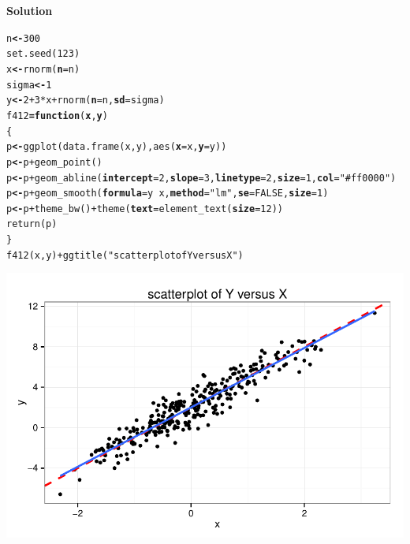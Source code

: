 \documentclass[12pt,oneside,a4paper]{article}\usepackage[]{graphicx}\usepackage[]{xcolor}
\makeatletter
\newcommand{\hlnum}[1]{\textcolor[rgb]{0,0,0}{#1}}%
\newcommand{\hlstr}[1]{\textcolor[rgb]{0,0,1}{#1}}%
\newcommand{\hlopt}[1]{\textcolor[rgb]{0,0,0}{#1}}%
\newcommand{\hlstd}[1]{\textcolor[rgb]{0,0,0}{#1}}%
\newcommand{\hlkwa}[1]{\textcolor[rgb]{0.498,0,0.333}{\textbf{#1}}}%
\newcommand{\hlkwb}[1]{\textcolor[rgb]{0.498,0,0.333}{\textbf{#1}}}%
\newcommand{\hlkwc}[1]{\textcolor[rgb]{0.498,0,0.333}{\textbf{#1}}}%
\newcommand{\hlkwd}[1]{\textcolor[rgb]{0,0,0}{#1}}%
\newenvironment{kframe}{%
 \def\at@end@of@kframe{}%
 \ifinner\ifhmode%
  \def\at@end@of@kframe{\end{minipage}}%
  \begin{minipage}{\columnwidth}%
 \fi\fi%
 \def\FrameCommand##1{\hskip\@totalleftmargin \hskip-\fboxsep
 \colorbox{shadecolor}{##1}\hskip-\fboxsep
     \hskip-\linewidth \hskip-\@totalleftmargin \hskip\columnwidth}%
 \MakeFramed {\advance\hsize-\width
   \@totalleftmargin\z@ \linewidth\hsize
   \@setminipage}}%
 {\par\unskip\endMakeFramed%
 \at@end@of@kframe}
\newenvironment{knitrout}{}{} %
\newcommand{\solution}
{
    \vspace{15pt}
    \noindent\ignorespaces\textbf{\large Solution}
}
\makeatother
\begin{document}
\solution
\begin{knitrout}
\color{fgcolor}\begin{kframe}
\begin{alltt}
\hlstd{n} \hlkwb{<-} \hlnum{300}
\hlkwd{set.seed}\hlstd{(}\hlnum{123}\hlstd{)}
\hlstd{x} \hlkwb{<-} \hlkwd{rnorm}\hlstd{(}\hlkwc{n} \hlstd{= n)}
\hlstd{sigma} \hlkwb{<-} \hlnum{1}
\hlstd{y} \hlkwb{<-} \hlnum{2} \hlopt{+} \hlnum{3} \hlopt{*} \hlstd{x} \hlopt{+} \hlkwd{rnorm}\hlstd{(}\hlkwc{n} \hlstd{= n,} \hlkwc{sd} \hlstd{= sigma)}
\hlstd{f412} \hlkwb{=} \hlkwa{function}\hlstd{(}\hlkwc{x}\hlstd{,} \hlkwc{y}\hlstd{)}
\hlstd{\{}
\hlstd{p} \hlkwb{<-} \hlkwd{ggplot}\hlstd{(}\hlkwd{data.frame}\hlstd{(x, y),} \hlkwd{aes}\hlstd{(}\hlkwc{x} \hlstd{= x,} \hlkwc{y} \hlstd{= y))}
\hlstd{p} \hlkwb{<-} \hlstd{p} \hlopt{+} \hlkwd{geom_point}\hlstd{()}
\hlstd{p} \hlkwb{<-} \hlstd{p} \hlopt{+} \hlkwd{geom_abline}\hlstd{(}\hlkwc{intercept} \hlstd{=} \hlnum{2}\hlstd{,} \hlkwc{slope} \hlstd{=} \hlnum{3}\hlstd{,} \hlkwc{linetype} \hlstd{=} \hlnum{2}\hlstd{,} \hlkwc{size} \hlstd{=} \hlnum{1}\hlstd{,} \hlkwc{col} \hlstd{=} \hlstr{"#ff0000"}\hlstd{)}
\hlstd{p} \hlkwb{<-} \hlstd{p} \hlopt{+} \hlkwd{geom_smooth}\hlstd{(}\hlkwc{formula} \hlstd{= y} \hlopt{~} \hlstd{x,} \hlkwc{method} \hlstd{=} \hlstr{"lm"}\hlstd{,} \hlkwc{se} \hlstd{=} \hlnum{FALSE}\hlstd{,} \hlkwc{size} \hlstd{=} \hlnum{1}\hlstd{)}
\hlstd{p} \hlkwb{<-} \hlstd{p} \hlopt{+} \hlkwd{theme_bw}\hlstd{()} \hlopt{+} \hlkwd{theme}\hlstd{(}\hlkwc{text} \hlstd{=} \hlkwd{element_text}\hlstd{(}\hlkwc{size} \hlstd{=} \hlnum{12}\hlstd{))}
\hlkwd{return}\hlstd{(p)}
\hlstd{\}}
\hlkwd{f412}\hlstd{(x, y)} \hlopt{+} \hlkwd{ggtitle}\hlstd{(}\hlstr{"scatterplot of Y versus X"}\hlstd{)}
\end{alltt}
\end{kframe}

{\centering \includegraphics[width=.8\linewidth]{figure/p4121} 

}



\end{knitrout}
\end{document}
